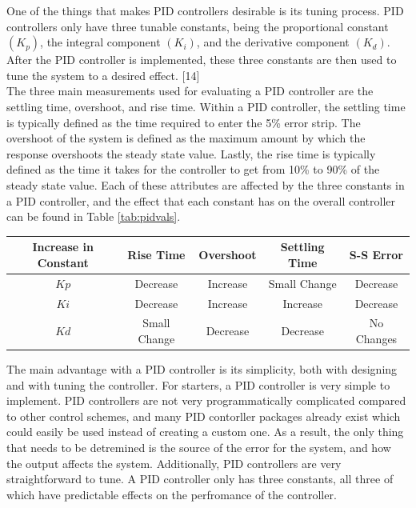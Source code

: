 \documentclass[titlepage]{article}
\begin{document}
\indent One of the things that makes PID controllers desirable is its tuning process. PID controllers only have three tunable constants, being the proportional constant \((K_p)\), the integral component \((K_i)\), and the derivative component \((K_d)\). After the PID controller is implemented, these three constants are then used to tune the system to a desired effect. [14]\\
\indent The three main measurements used for evaluating a PID controller are the settling time, overshoot, and rise time. Within a PID controller, the settling time is typically defined as the time required to enter the 5\% error strip. The overshoot of the system is defined as the maximum amount by which the response overshoots the steady state value. Lastly, the rise time is typically defined as the time it takes for the controller to get from 10\% to 90\% of the steady state value. Each of these attributes are affected by the three constants in a PID controller, and the effect that each constant has on the overall controller can be found in Table \ref{tab:pidvals}.

\begin{center}
	 \label{tab:pidvals} 
	\begin{tabular}{|c | c | c | c | c |} 
	 \hline
	 Increase in Constant & Rise Time & Overshoot & Settling Time &S-S Error \\ [0.5ex] 
	 \hline
	 \(Kp\) & Decrease & Increase & Small Change & Decrease \\ 
	 \hline
	 \(Ki\) & Decrease & Increase & Increase & Decrease \\
	 \hline
	 \(Kd\) & Small Change & Decrease & Decrease & No Changes \\ 
	 \hline
	\end{tabular}
\end{center}

The main advantage with a PID controller is its simplicity, both with designing and with tuning the controller. For starters, a PID controller is very simple to implement. PID controllers are not very programmatically complicated compared to other control schemes, and many PID contorller packages already exist which could easily be used instead of creating a custom one. As a result, the only thing that needs to be detremined is the source of the error for the system, and how the output affects the system. Additionally, PID controllers are very straightforward to tune. A PID controller only has three constants, all three of which have predictable effects on the perfromance of the controller.
\end{document}
